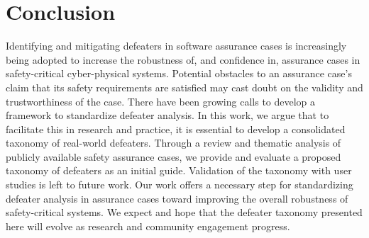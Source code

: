 \section{Conclusion}
\label{sec:conclusion}

Identifying and mitigating defeaters in software assurance cases is increasingly being adopted to increase the robustness of, and confidence in, assurance cases in safety-critical cyber-physical systems. Potential obstacles to an assurance case's claim that its safety requirements are satisfied may cast doubt on the validity and trustworthiness of the case. 
There have been growing calls to develop a framework to standardize defeater analysis. 
In this work, we argue that to facilitate this in research and practice, it is essential to develop a consolidated taxonomy of real-world defeaters. Through a review and 
thematic analysis of publicly available safety assurance cases, we provide and evaluate a proposed taxonomy of defeaters as an initial guide. 
Validation of the taxonomy with user studies is left to future work.
Our work offers a necessary step for standardizing defeater analysis in assurance cases toward improving the overall robustness of safety-critical systems. We expect and hope that the defeater taxonomy presented here will evolve as research and community engagement progress. 
